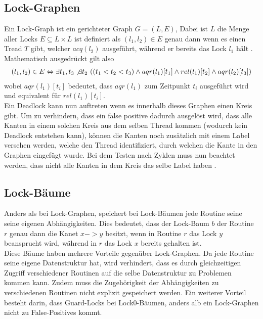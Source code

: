\subsection{Lock-Graphen}
Ein Lock-Graph ist ein gerichteter Graph $G = (L, E)$, Dabei ist $L$ die Menge 
aller Locks $E \subseteq L \times L$ ist definiert als $(l_1, l_2) \in E$ genau 
dann wenn es einen Tread $T$ gibt, welcher $acq(l_2)$ ausgeführt, während er 
bereits das Lock $l_1$ hält \cite{bensalem}. Mathematisch ausgedrückt gilt also 
\begin{align*}
    (l_1, l_2) \in E \Leftrightarrow \exists t_1, t_3 \not\exists t_2\ ((t_1 < t_2 < t_3) \land aqr(l_1)[t_1] \land rel(l_1)[t_2] \land  aqr(l_2)[t_3])
\end{align*}
wobei $aqr(l_1)[t_i]$ bedeutet, dass $aqr(l_1)$ zum Zeitpunkt $t_i$ ausgeführt 
wird und equivalent für $rel(l_1)[t_i]$.\\
Ein Deadlock kann nun auftreten wenn es innerhalb dieses Graphen einen Kreis 
gibt. Um zu verhindern, dass ein false positive dadurch ausgelöst wird, dass 
alle Kanten in einem solchen Kreis aus dem selben Thread kommen (wodurch kein 
Deadlock entstehen kann), können die Kanten noch zusätzlich mit einem Label 
versehen werden, welche den Thread identifiziert, durch welchen die Kante in 
den Graphen eingefügt wurde. Bei dem Testen nach Zyklen muss nun beachtet 
werden, dass nicht alle Kanten in dem Kreis das selbe Label haben 
\cite{bensalem}. 
\subsection{Lock-Bäume}
Anders als bei Lock-Graphen, speichert bei Lock-Bäumen jede Routine seine 
seine eigenen Abhängigkeiten. Dies bedeutet, dass der Lock-Baum $b$ der 
Routine $r$ genau dann die Kanet $x->y$ besitzt, wenn in Routine $r$ das 
Lock $y$ beansprucht wird, während in $r$ das Lock $x$ bereits gehalten ist.\\
Diese Bäume haben mehrere Vorteile gegenüber Lock-Graphen. Da jede Routine seine 
eigene Datenstruktur hat, wird verhindert, dass es durch 
gleichzeitigen Zugriff verschiedener Routinen auf die selbe Datenstruktur zu 
Problemen kommen kann. Zudem muss die Zugehörigkeit der Abhängigkeiten zu 
verschiedenen Routinen nicht explizit gespeichert werden. Ein weiterer Vorteil 
besteht darin, dass Guard-Locks bei Lock0-Bäumen, anders alb ein Lock-Graphen
nicht zu False-Positives kommt.  
